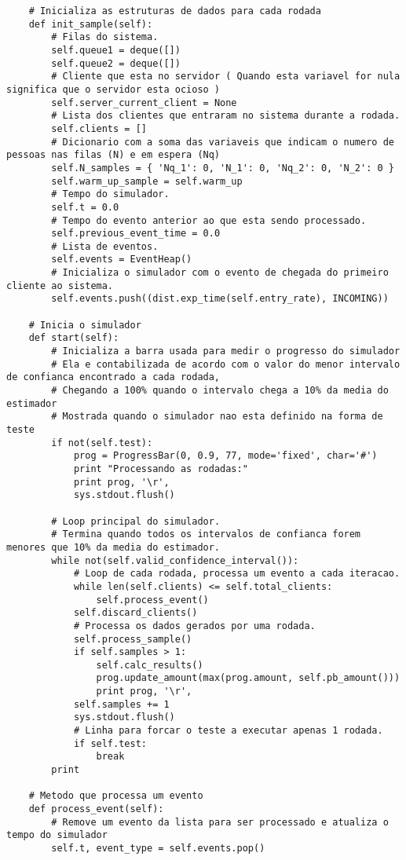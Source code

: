 \begin{lstlisting}
    # Inicializa as estruturas de dados para cada rodada
    def init_sample(self):
        # Filas do sistema.
        self.queue1 = deque([])
        self.queue2 = deque([])
        # Cliente que esta no servidor ( Quando esta variavel for nula significa que o servidor esta ocioso )
        self.server_current_client = None
        # Lista dos clientes que entraram no sistema durante a rodada.
        self.clients = []
        # Dicionario com a soma das variaveis que indicam o numero de pessoas nas filas (N) e em espera (Nq)
        self.N_samples = { 'Nq_1': 0, 'N_1': 0, 'Nq_2': 0, 'N_2': 0 }
        self.warm_up_sample = self.warm_up
        # Tempo do simulador.
        self.t = 0.0
        # Tempo do evento anterior ao que esta sendo processado.
        self.previous_event_time = 0.0
        # Lista de eventos.
        self.events = EventHeap()
        # Inicializa o simulador com o evento de chegada do primeiro cliente ao sistema.
        self.events.push((dist.exp_time(self.entry_rate), INCOMING))
    
    # Inicia o simulador
    def start(self):
        # Inicializa a barra usada para medir o progresso do simulador
        # Ela e contabilizada de acordo com o valor do menor intervalo de confianca encontrado a cada rodada,
        # Chegando a 100% quando o intervalo chega a 10% da media do estimador
        # Mostrada quando o simulador nao esta definido na forma de teste
        if not(self.test):
            prog = ProgressBar(0, 0.9, 77, mode='fixed', char='#')
            print "Processando as rodadas:"
            print prog, '\r',
            sys.stdout.flush()
        
        # Loop principal do simulador.
        # Termina quando todos os intervalos de confianca forem menores que 10% da media do estimador.
        while not(self.valid_confidence_interval()):
            # Loop de cada rodada, processa um evento a cada iteracao.
            while len(self.clients) <= self.total_clients:
                self.process_event()
            self.discard_clients()
            # Processa os dados gerados por uma rodada.
            self.process_sample()
            if self.samples > 1:
                self.calc_results()
                prog.update_amount(max(prog.amount, self.pb_amount()))
                print prog, '\r',
            self.samples += 1
            sys.stdout.flush()
            # Linha para forcar o teste a executar apenas 1 rodada.
            if self.test:
                break
        print
    
    # Metodo que processa um evento
    def process_event(self):
        # Remove um evento da lista para ser processado e atualiza o tempo do simulador
        self.t, event_type = self.events.pop()


\end{lstlisting}
